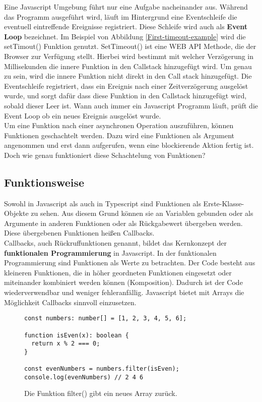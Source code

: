 \noindent
Eine Javascript Umgebung führt nur eine Aufgabe nacheinander aus. Während das Programm ausgeführt wird, läuft im Hintergrund eine Eventschleife die eventuell eintreffende Ereignisse registriert. Diese Schleife wird auch als \textbf{Event Loop} bezeichnet. Im Beispiel von Abbildung \ref{First-timeout-example} wird die setTimout() Funktion genutzt. SetTimeout() ist eine WEB API Methode, die der Browser zur Verfügung stellt. Hierbei wird bestimmt mit welcher Verzögerung in Millisekunden die innere Funktion in den Callstack hinzugefügt wird. Um genau zu sein, wird die innere Funktion nicht direkt in den Call stack hinzugefügt. Die Eventschleife registriert, dass ein Ereignis nach einer Zeitverzögerung ausgelöst wurde, und sorgt dafür dass diese Funktion in den Callstack hinzugefügt wird, sobald dieser Leer ist. Wann auch immer ein Javascript Programm läuft, prüft die Event Loop ob ein neues Ereignis ausgelöst wurde\cite{regular-event-loop}.\\

\noindent
Um eine Funktion nach einer asynchronen Operation auszuführen, können Funktionen geschachtelt werden. Dazu wird eine Funktionen als Argument angenommen und erst dann aufgerufen, wenn eine blockierende Aktion fertig ist. Doch wie genau funktioniert diese Schachtelung von Funktionen?

\subsection{Funktionsweise}

Sowohl in Javascript als auch in Typescript sind Funktionen als Erste-Klasse-Objekte zu sehen. Aus diesem Grund können sie an Variablen gebunden oder als Argumente in anderen Funktionen oder als Rückgabewert übergeben werden. Diese übergebenen Funktionen heißen Callbacks.\\

\noindent
Callbacks, auch Rückruffunktionen genannt, bildet das Kernkonzept der \textbf{funktionalen Programmierung} in Javascript\cite{callbacks-intro}. In der funktionalen Programmierung sind Funktionen als Werte zu betrachten. Der Code besteht aus kleineren Funktionen, die in höher geordneten Funktionen eingesetzt oder miteinander kombiniert werden können (Komposition). Dadurch ist der Code wiederverwendbar und weniger fehleranfällig. Javascript bietet mit Arrays die Möglichkeit Callbacks sinnvoll einzusetzen.

\begin{figure}[H]
\begin{lstlisting}[basicstyle=\small]
const numbers: number[] = [1, 2, 3, 4, 5, 6];

function isEven(x): boolean { 
  return x % 2 === 0; 
}

const evenNumbers = numbers.filter(isEven);
console.log(evenNumbers) // 2 4 6
\end{lstlisting}
\caption{Die Funktion filter() gibt ein neues Array zurück.}
\label{callbacks-with-arrays}
\end{figure}

